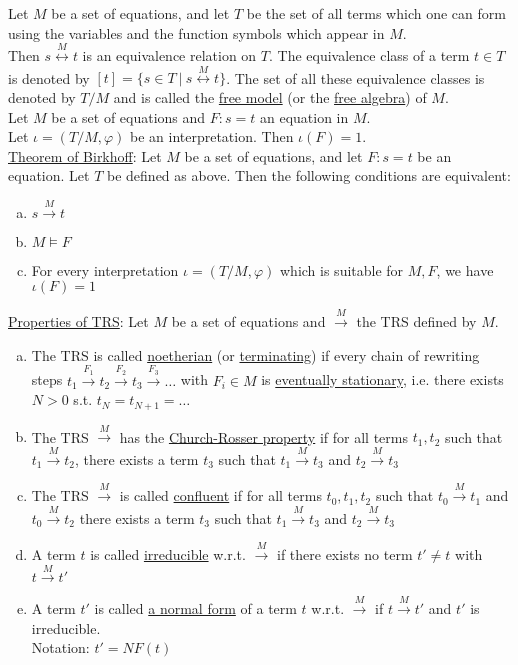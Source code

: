 \documentclass[a4paper]{article}
\newcommand{\ul}{\underline}
\let\phi\varphi
\begin{document}
Let $M$ be a set of equations, and let $T$ be the set of all terms which one can form using the variables and the function symbols which appear in $M$.\\
Then $s\overset{M}{\leftrightarrow}t$ is an equivalence relation on $T$. The equivalence class of a term $t\in T$ is denoted by $\left[t\right]=\{s\in T\ \vert\ s\overset{M}{\leftrightarrow}t\}$. The set of all these equivalence classes is denoted by $T/M$ and is called the \ul{free model} (or the \ul{free algebra}) of $M$.\\
Let $M$ be a set of equations and $F:s=t$ an equation in $M$.\\
Let $\iota=(T/M,\phi)$ be an interpretation. Then $\iota(F)=1$.\\
\ul{Theorem of Birkhoff}: Let $M$ be a set of equations, and let $F:s=t$ be an equation. Let $T$ be defined as above. Then the following conditions are equivalent:
\begin{enumerate}[(a)]
	\item $s\overset{M}{\rightarrow}t$
	\item $M\models F$
	\item For every interpretation $\iota=(T/M,\phi)$ which is suitable for $M,F$, we have $\iota(F)=1$
\end{enumerate}
\ul{Properties of TRS}: Let $M$ be a set of equations and $\overset{M}{\rightarrow}$ the TRS defined by $M$.
\begin{enumerate}[(a)]
	\item The TRS is called \ul{noetherian} (or \ul{terminating}) if every chain of rewriting steps $t_1\overset{F_1}{\rightarrow}t_2\overset{F_2}{\rightarrow}t_3\overset{F_3}{\rightarrow}\dots$ with $F_i\in M$ is \ul{eventually stationary}, i.e. there exists $N>0$ s.t. $t_N=t_{N+1}=\dots$
	\item The TRS $\overset{M}{\rightarrow}$ has the \ul{Church-Rosser property} if for all terms $t_1,t_2$ such that $t_1\overset{M}{\rightarrow}t_2$, there exists a term $t_3$ such that $t_1\overset{M}{\rightarrow}t_3$ and $t_2\overset{M}{\rightarrow}t_3$
	\item The TRS $\overset{M}{\rightarrow}$ is called \ul{confluent} if for all terms $t_0,t_1,t_2$ such that $t_0\overset{M}{\rightarrow}t_1$ and $t_0\overset{M}{\rightarrow}t_2$ there exists a term $t_3$ such that $t_1\overset{M}{\rightarrow}t_3$ and $t_2\overset{M}{\rightarrow}t_3$
	\item A term $t$ is called \ul{irreducible} w.r.t. $\overset{M}{\rightarrow}$ if there exists no term $t'\neq t$ with $t\overset{M}{\rightarrow}t'$
	\item A term $t'$ is called \ul{a normal form} of a term $t$ w.r.t. $\overset{M}{\rightarrow}$ if $t\overset{M}{\rightarrow}t'$ and $t'$ is irreducible.\\
	Notation: $t'=NF(t)$
\end{enumerate}
\end{document}

